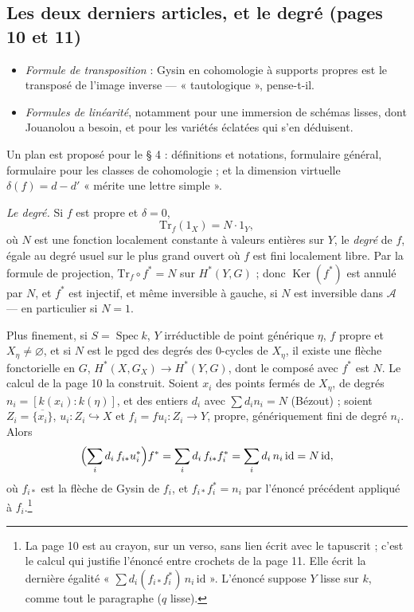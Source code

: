 \documentclass[11pt,a4paper]{article}
\begin{document}
\subsection*{Les deux derniers articles, et le degré (pages 10 et 11)}

\begin{itemize}
\item[i)] \emph{Formule de transposition} : Gysin en cohomologie à supports
propres est le transposé de l'image inverse --- « tautologique »,
pense-t-il.
\item[j)] \emph{Formules de linéarité}, notamment pour une immersion de
schémas lisses, dont Jouanolou a besoin, et pour les variétés éclatées qui
s'en déduisent.
\end{itemize}

Un plan est proposé pour le § 4 : définitions et notations, formulaire
général, formulaire pour les classes de cohomologie ; et la dimension
virtuelle $\delta(f) = d - d'$ « mérite une lettre simple ».

\emph{Le degré.} Si $f$ est propre et $\delta = 0$,
\[
\mathrm{Tr}_f(1_X) = N\cdot 1_Y,
\]
où $N$ est une fonction localement constante à valeurs entières sur $Y$, le
\emph{degré} de $f$, égale au degré usuel sur le plus grand ouvert où $f$ est
fini localement libre. Par la formule de projection,
$\mathrm{Tr}_f \circ f^* = N$ sur $H^*(Y, G)$ ; donc $\operatorname{Ker}(f^*)$
est annulé par $N$, et $f^*$ est injectif, et même inversible à gauche, si $N$
est inversible dans $\mathcal{A}$ --- en particulier si $N = 1$.

Plus finement, si $S = \operatorname{Spec} k$, $Y$ irréductible de point
générique $\eta$, $f$ propre et $X_\eta \neq \varnothing$, et si $N$ est le
pgcd des degrés des $0$-cycles de $X_\eta$, il existe une flèche fonctorielle
en $G$, $H^*(X, G_X) \to H^*(Y, G)$, dont le composé avec $f^*$ est $N$. Le
calcul de la page 10 la construit. Soient $x_i$ des points fermés de $X_\eta$,
de degrés $n_i = [k(x_i) : k(\eta)]$, et des entiers $d_i$ avec
$\sum d_i n_i = N$ (Bézout) ; soient $Z_i = \overline{\{x_i\}}$,
$u_i\colon Z_i \hookrightarrow X$ et $f_i = f u_i\colon Z_i \to Y$, propre,
génériquement fini de degré $n_i$. Alors
\[
\Bigl(\sum_i d_i\, f_{i*} u_i^*\Bigr) f^* = \sum_i d_i\, f_{i*} f_i^* =
\sum_i d_i\, n_i\, \mathrm{id} = N\,\mathrm{id},
\]
où $f_{i*}$ est la flèche de Gysin de $f_i$, et $f_{i*}f_i^* = n_i$ par
l'énoncé précédent appliqué à $f_i$.\footnote{La page 10 est au crayon, sur
un verso, sans lien écrit avec le tapuscrit ; c'est le calcul qui justifie
l'énoncé entre crochets de la page 11. Elle écrit la dernière égalité
« $\sum d_i (f_{i*}f_i^*)\, n_i\, \mathrm{id}$ ». L'énoncé suppose $Y$ lisse
sur $k$, comme tout le paragraphe ($q$ lisse).}
\end{document}
